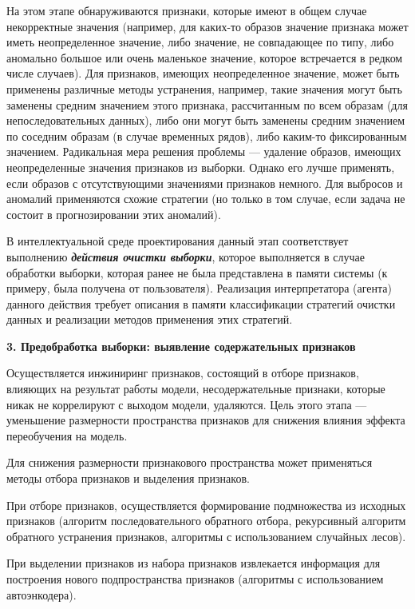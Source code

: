 На этом этапе обнаруживаются признаки, которые имеют в общем случае некорректные значения (например, для каких-то образов значение признака может иметь неопределенное значение, либо значение, не совпадающее по типу, либо аномально большое или очень маленькое значение, которое встречается в редком числе случаев). Для признаков, имеющих неопределенное значение, может быть применены различные методы устранения, например, такие значения могут быть заменены средним значением этого признака, рассчитанным по всем образам (для непоследовательных данных), либо они могут быть заменены средним значением по соседним образам (в случае временных рядов), либо каким-то фиксированным значением. Радикальная мера решения проблемы --- удаление образов, имеющих неопределенные значения признаков из выборки. Однако его лучше применять, если образов с отсутствующими значениями признаков немного. Для выбросов и аномалий применяются схожие стратегии (но только в том случае, если задача не состоит в прогнозировании этих аномалий).

В интеллектуальной среде проектирования данный этап соответствует выполнению \textbf{\textit{действия очистки выборки}}, которое выполняется в случае обработки выборки, которая ранее не была представлена в памяти системы (к примеру, была получена от пользователя).
Реализация интерпретатора (агента) данного действия требует описания в памяти классификации стратегий очистки данных и реализации методов применения этих стратегий.


\textbf{3. Предобработка выборки: выявление содержательных признаков}

Осуществляется инжиниринг признаков, состоящий в отборе признаков, влияющих на результат работы модели, несодержательные признаки, которые никак не коррелируют с выходом модели, удаляются. Цель этого этапа --- уменьшение размерности пространства признаков для снижения влияния эффекта переобучения на модель.

Для снижения размерности признакового пространства может применяться методы отбора признаков и выделения признаков.

При отборе признаков, осуществляется формирование подмножества из исходных признаков (алгоритм последовательного обратного отбора, рекурсивный алгоритм обратного устранения признаков,  алгоритмы с использованием случайных лесов).

При выделении признаков из набора признаков извлекается информация для построения нового подпространства признаков (алгоритмы с использованием автоэнкодера).


